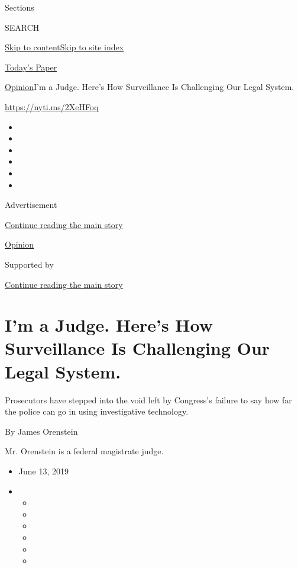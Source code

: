 Sections

SEARCH

\protect\hyperlink{site-content}{Skip to
content}\protect\hyperlink{site-index}{Skip to site index}

\href{https://myaccount.nytimes.com/auth/login?response_type=cookie\&client_id=vi}{}

\href{https://www.nytimes.com/section/todayspaper}{Today's Paper}

\href{/section/opinion}{Opinion}\textbar{}I'm a Judge. Here's How
Surveillance Is Challenging Our Legal System.

\url{https://nyti.ms/2XeHFoq}

\begin{itemize}
\item
\item
\item
\item
\item
\item
\end{itemize}

Advertisement

\protect\hyperlink{after-top}{Continue reading the main story}

\href{/section/opinion}{Opinion}

Supported by

\protect\hyperlink{after-sponsor}{Continue reading the main story}

\hypertarget{im-a-judge-heres-how-surveillance-is-challenging-our-legal-system}{%
\section{I'm a Judge. Here's How Surveillance Is Challenging Our Legal
System.}\label{im-a-judge-heres-how-surveillance-is-challenging-our-legal-system}}

Prosecutors have stepped into the void left by Congress's failure to say
how far the police can go in using investigative technology.

By James Orenstein

Mr. Orenstein is a federal magistrate judge.

\begin{itemize}
\item
  June 13, 2019
\item
  \begin{itemize}
  \item
  \item
  \item
  \item
  \item
  \item
  \end{itemize}
\end{itemize}

